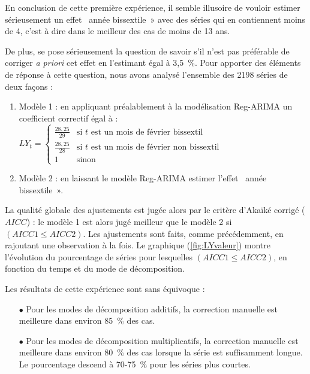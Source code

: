 \documentclass[12pt, a4paper, french]{article}
\begin{document}
\clearpage

En conclusion de cette première expérience, il semble illusoire de vouloir estimer sérieusement un effet \og~année bissextile~» avec des séries qui en contiennent moins de 4, c'est à dire dans le meilleur des cas de moins de 13 ans.

De plus, se pose sérieusement la question de savoir s'il n'est pas préférable de corriger \emph{a priori} cet effet en l'estimant égal à 3,5~\%. Pour apporter des éléments de réponse à cette question, nous avons analysé l'ensemble des 2198 séries de deux façons :
\begin{enumerate}
	\item Modèle 1 : en appliquant préalablement à la modélisation Reg-ARIMA un coefficient correctif égal à :
$
LY_{t} = \left\{ \begin{array}{rl} 
                \frac{28,25}{29} & \mbox{si } t \mbox{ est un mois de février bissextil } \\
                \frac{28,25}{28} & \mbox{si } t \mbox{ est un mois de février non bissextil } \\
                1 & \mbox{sinon}
               \end{array}
         \right.
$
  \item Modèle 2 : en laissant le modèle Reg-ARIMA estimer l'effet \og~année bissextile~».
\end{enumerate}

La qualité globale des ajustements est jugée alors par le critère d'Akaïké corrigé ($AICC$) : le modèle 1 est alors jugé meilleur que le modèle 2 si $(AICC1 \le AICC2)$. Les ajustements sont faits, comme précédemment, en rajoutant une observation à la fois.
Le graphique (\ref{fig:LYvaleur}) montre l'évolution du pourcentage de séries pour lesquelles $(AICC1 \le AICC2)$, en fonction du temps et du mode de décomposition.

Les résultats de cette expérience sont sans équivoque : 
\begin{itemize}
	\item [$\bullet$] Pour les modes de décomposition additifs, la correction manuelle est meilleure dans environ 85~\% des cas.
	\item [$\bullet$] Pour les modes de décomposition multiplicatifs, la correction manuelle est meilleure dans environ 80~\% des cas lorsque la série est suffisamment longue. Le pourcentage descend à 70-75~\% pour les séries plus courtes.
\end{itemize}
\end{document}
